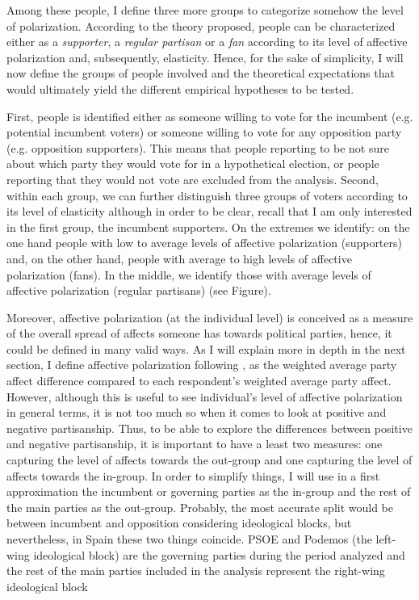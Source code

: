 \documentclass[a4paper, svgnames]{article}
\begin{document}
Among these people, I define three more groups to categorize somehow the level of polarization. According to the theory proposed, people can be characterized either as a \textit{supporter}, a \textit{regular partisan} or a \textit{fan} according to its level of affective polarization and, subsequently, elasticity. Hence, for the sake of simplicity, I will now define the groups of people involved and the theoretical expectations that would ultimately yield the different empirical hypotheses to be tested.

First, people is identified either as someone willing to vote for the incumbent (e.g. potential incumbent voters) or someone willing to vote for any opposition party (e.g. opposition supporters). This means that people reporting to be not sure about which party they would vote for in a hypothetical election, or people reporting that they would not vote are excluded from the analysis. Second, within each group, we can further distinguish three groups of voters according to its level of elasticity although in order to be clear, recall that I am only interested in the first group, the incumbent supporters. On the extremes we identify: on the one hand people with low to average levels of affective polarization (supporters) and, on the other hand, people with average to high levels of affective polarization (fans). In the middle, we identify those with average levels of affective polarization (regular partisans) (see Figure).

Moreover, affective polarization (at the individual level) is conceived as a measure of the overall spread of affects someone has towards political parties, hence, it could be defined in many valid ways. As I will explain more in depth in the next section, I define affective polarization following \citet*{Wagner2021}, as the weighted average party affect difference compared to each respondent’s weighted
average party affect. However, although this is useful to see individual's level of affective polarization in general terms, it is not too much so when it comes to look at positive and negative partisanship. Thus, to be able to explore the differences between positive and negative partisanship, it is important to have a least two measures: one capturing the level of affects towards the out-group and one capturing the level of affects towards the in-group. In order to simplify things, I will use in a first approximation the incumbent or governing parties as the in-group and the rest of the main parties as the out-group. Probably, the most accurate split would be between incumbent and opposition considering ideological blocks, but nevertheless, in Spain these two things coincide. PSOE and Podemos (the left-wing ideological block) are the governing parties during the period analyzed and the rest of the main parties included in the analysis represent the right-wing ideological block
\end{document}
